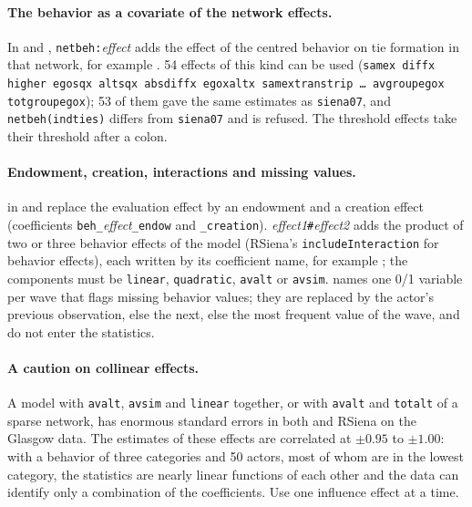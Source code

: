 \paragraph{The behavior as a covariate of the network effects.} In  and , \texttt{netbeh:}\emph{effect} adds the effect of the centred behavior on tie formation in that network, for example . 54 effects of this kind can be used (\texttt{samex diffx higher egosqx altsqx absdiffx egoxaltx samextranstrip \ldots{} avgroupegox totgroupegox}); 53 of them gave the same estimates as \texttt{siena07}, and \texttt{netbeh(indties)} differs from \texttt{siena07} and is refused. The threshold effects take their threshold after a colon.

\paragraph{Endowment, creation, interactions and missing values.}  in  and  replace the evaluation effect by an endowment and a creation effect (coefficients \texttt{beh\_}\emph{effect}\texttt{\_endow} and \texttt{\_creation}). \emph{effect1}\texttt{\#}\emph{effect2}\opt{)} adds the product of two or three behavior effects of the model (RSiena's \texttt{includeInteraction} for behavior effects), each written by its coefficient name, for example ; the components must be \texttt{linear}, \texttt{quadratic}, \texttt{avalt} or \texttt{avsim}.  names one 0/1 variable per wave that flags missing behavior values; they are replaced by the actor's previous observation, else the next, else the most frequent value of the wave, and do not enter the statistics.

\paragraph{A caution on collinear effects.} A model with \texttt{avalt}, \texttt{avsim} and \texttt{linear} together, or with \texttt{avalt} and \texttt{totalt} of a sparse network, has enormous standard errors in both \nwsaom{} and RSiena on the Glasgow data. The estimates of these effects are correlated at $\pm0.95$ to $\pm1.00$: with a behavior of three categories and 50 actors, most of whom are in the lowest category, the statistics are nearly linear functions of each other and the data can identify only a combination of the coefficients. Use one influence effect at a time.

